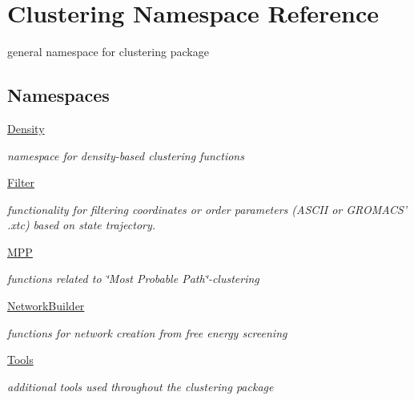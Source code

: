 \hypertarget{namespaceClustering}{\section{Clustering Namespace Reference}
\label{namespaceClustering}
}


general namespace for clustering package  


\subsection*{Namespaces}
\begin{DoxyCompactItemize}
\item 
\hyperlink{namespaceClustering_1_1Density}{Density}
\begin{DoxyCompactList}\small\item\em namespace for density-\/based clustering functions \end{DoxyCompactList}\item 
\hyperlink{namespaceClustering_1_1Filter}{Filter}
\begin{DoxyCompactList}\small\item\em functionality for filtering coordinates or order parameters (A\-S\-C\-I\-I or G\-R\-O\-M\-A\-C\-S' .xtc) based on state trajectory. \end{DoxyCompactList}\item 
\hyperlink{namespaceClustering_1_1MPP}{M\-P\-P}
\begin{DoxyCompactList}\small\item\em functions related to \char`\"{}\-Most Probable Path\char`\"{}-\/clustering \end{DoxyCompactList}\item 
\hyperlink{namespaceClustering_1_1NetworkBuilder}{Network\-Builder}
\begin{DoxyCompactList}\small\item\em functions for network creation from free energy screening \end{DoxyCompactList}\item 
\hyperlink{namespaceClustering_1_1Tools}{Tools}
\begin{DoxyCompactList}\small\item\em additional tools used throughout the {\itshape clustering} package \end{DoxyCompactList}\end{DoxyCompactItemize}
